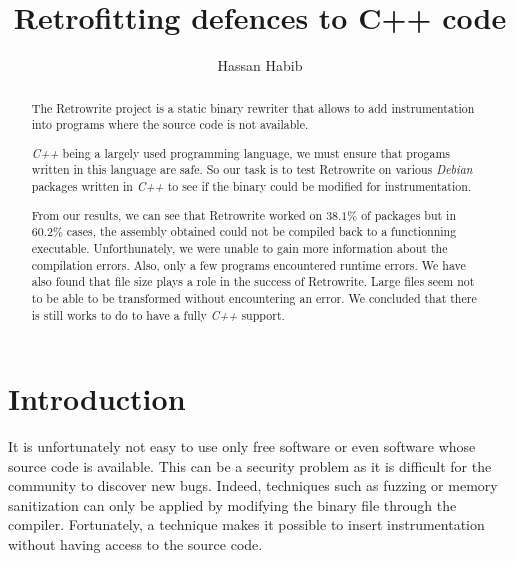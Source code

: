 \documentclass[a4paper,11pt,oneside]{report}
\title{Retrofitting defences to C++ code}
\author{Hassan Habib}
\newcommand{\sysname}{Retrowrite\xspace}
\begin{document}
\maketitle

\begin{abstract}
    The \sysname project is a static binary rewriter that allows to add
    instrumentation into programs where the source code is not available.


    \textit{C++} being a largely used programming language, we must ensure that
    progams written in this language are safe. So our task is to test \sysname on
    various \textit{Debian} packages written in \textit{C++} to see if the binary
    could be modified for instrumentation.

    From our results, we can see that \sysname worked on $38.1\%$ of packages but in
    $60.2 \%$ cases, the assembly obtained could not be compiled back to a
    functionning executable. Unforthunately, we were unable to gain more
    information about the compilation errors. Also, only a few programs encountered
    runtime errors. We have also found that file size plays a role in the
    success of \sysname. Large files seem not to be able to be
    transformed without encountering an error.
    We concluded that there is still works to do to have a fully \textit{C++} support.

\end{abstract}


\maketoc

\chapter{Introduction}

%
It is unfortunately not easy to use only free software or even software whose
source code is available. This can be a security problem as it is difficult
for the community to discover new bugs. Indeed, techniques such as fuzzing or
memory sanitization can only be applied by modifying the binary file through the
compiler. Fortunately, a technique makes it possible to insert instrumentation
without having access to the source code.
\end{document}
